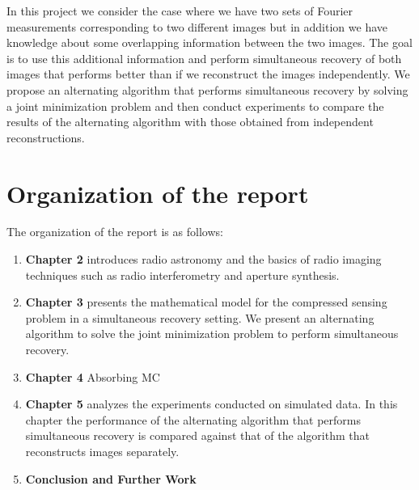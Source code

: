 In this project we consider the case where we have two sets of Fourier measurements corresponding to two different images but in addition we have knowledge about some overlapping information between the two images. The goal is to use this additional information and perform  simultaneous recovery of both images that performs better than if we reconstruct the images independently.  We propose an alternating algorithm that performs simultaneous recovery by solving a joint minimization problem and then conduct experiments to compare the results of the alternating algorithm with those obtained from independent reconstructions. 



\section*{Organization of the report}
The organization of the report is as follows:
\begin{enumerate}

	\item \textbf{Chapter 2} introduces radio astronomy and the basics of radio imaging techniques such as radio interferometry and aperture synthesis.

	\item \textbf{Chapter 3} presents the mathematical model for the compressed sensing problem in a simultaneous recovery setting. We present an alternating algorithm to solve the joint minimization problem to perform simultaneous recovery.

	\item \textbf{Chapter 4} Absorbing MC

	\item \textbf{Chapter 5} analyzes the experiments conducted on simulated data. In this chapter the performance of the alternating algorithm that performs simultaneous recovery is compared against that of the algorithm that reconstructs images separately.

	\item \textbf{Conclusion and Further Work}

\end{enumerate}


